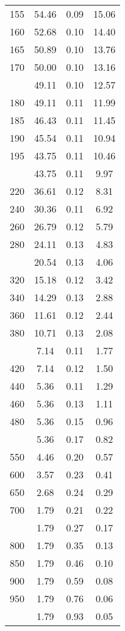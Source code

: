 \begin{table}[ht]
\begin{tabular}{lccc}
  155 & 54.46 & 0.09 & 15.06 \\ 
  160 & 52.68 & 0.10 & 14.40 \\ 
  165 & 50.89 & 0.10 & 13.76 \\ 
  170 & 50.00 & 0.10 & 13.16 \\ 
   \addlinespace
175 & 49.11 & 0.10 & 12.57 \\ 
  180 & 49.11 & 0.11 & 11.99 \\ 
  185 & 46.43 & 0.11 & 11.45 \\ 
  190 & 45.54 & 0.11 & 10.94 \\ 
  195 & 43.75 & 0.11 & 10.46 \\ 
   \addlinespace
200 & 43.75 & 0.11 & 9.97 \\ 
  220 & 36.61 & 0.12 & 8.31 \\ 
  240 & 30.36 & 0.11 & 6.92 \\ 
  260 & 26.79 & 0.12 & 5.79 \\ 
  280 & 24.11 & 0.13 & 4.83 \\ 
   \addlinespace
300 & 20.54 & 0.13 & 4.06 \\ 
  320 & 15.18 & 0.12 & 3.42 \\ 
  340 & 14.29 & 0.13 & 2.88 \\ 
  360 & 11.61 & 0.12 & 2.44 \\ 
  380 & 10.71 & 0.13 & 2.08 \\ 
   \addlinespace
400 & 7.14 & 0.11 & 1.77 \\ 
  420 & 7.14 & 0.12 & 1.50 \\ 
  440 & 5.36 & 0.11 & 1.29 \\ 
  460 & 5.36 & 0.13 & 1.11 \\ 
  480 & 5.36 & 0.15 & 0.96 \\ 
   \addlinespace
500 & 5.36 & 0.17 & 0.82 \\ 
  550 & 4.46 & 0.20 & 0.57 \\ 
  600 & 3.57 & 0.23 & 0.41 \\ 
  650 & 2.68 & 0.24 & 0.29 \\ 
  700 & 1.79 & 0.21 & 0.22 \\ 
   \addlinespace
750 & 1.79 & 0.27 & 0.17 \\ 
  800 & 1.79 & 0.35 & 0.13 \\ 
  850 & 1.79 & 0.46 & 0.10 \\ 
  900 & 1.79 & 0.59 & 0.08 \\ 
  950 & 1.79 & 0.76 & 0.06 \\ 
   \addlinespace
1000 & 1.79 & 0.93 & 0.05 \\ 
   \bottomrule
\end{tabular}
\end{table}
